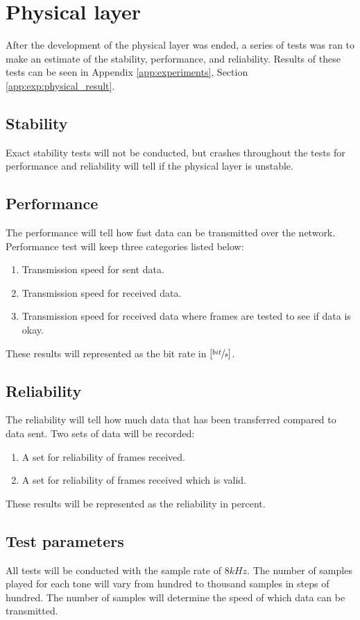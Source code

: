 \section{Physical layer}
After the development of the physical layer was ended, a series of tests was ran to make an estimate of the stability, performance, and reliability. Results of these tests can be seen in Appendix \ref{app:experiments}, Section \ref{app:exp:physical_result}.

	\subsection{Stability}
	Exact stability tests will not be conducted, but crashes throughout the tests for performance and reliability will tell if the physical layer is unstable.

	\subsection{Performance}
	The performance will tell how fast data can be transmitted over the network. Performance test will keep three categories listed below:
	
	\begin{enumerate}
	\item Transmission speed for sent data.
	\item Transmission speed for received data.
	\item Transmission speed for received data where frames are tested to see if data is okay.
	\end{enumerate}
	These results will represented as the bit rate in $[\sfrac{bit}{s}]$.
	
	\subsection{Reliability}
	The reliability will tell how much data that has been transferred compared to data sent. Two sets of data will be recorded:
	
	\begin{enumerate}
	\item A set for reliability of frames received.
	\item A set for reliability of frames received which is valid.
	\end{enumerate}
	These results will be represented as the reliability in percent.
	
	\subsection{Test parameters}
	All tests will be conducted with the sample rate of $8kHz$. The number of samples played for each tone will vary from hundred to thousand samples in steps of hundred. The number of samples will determine the speed of which data can be transmitted.
	
